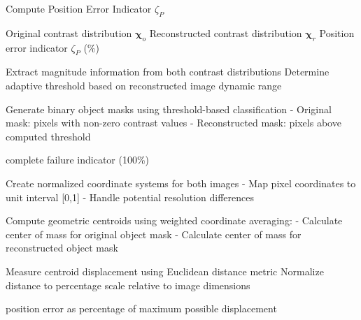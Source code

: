 \begin{algorithm}
\caption{Compute Position Error Indicator $\zeta_P$}
\label{alg:compute_zeta_p}
\begin{algorithmic}[1]
\REQUIRE Original contrast distribution $\boldsymbol{\chi}_o$
\REQUIRE Reconstructed contrast distribution $\boldsymbol{\chi}_r$
\ENSURE Position error indicator $\zeta_P$ (\%)

\STATE Extract magnitude information from both contrast distributions
\STATE Determine adaptive threshold based on reconstructed image dynamic range

\STATE Generate binary object masks using threshold-based classification
\STATE \quad - Original mask: pixels with non-zero contrast values
\STATE \quad - Reconstructed mask: pixels above computed threshold

    \RETURN complete failure indicator (100\%)
\ENDIF

\STATE Create normalized coordinate systems for both images
\STATE \quad - Map pixel coordinates to unit interval [0,1]
\STATE \quad - Handle potential resolution differences

\STATE Compute geometric centroids using weighted coordinate averaging:
\STATE \quad - Calculate center of mass for original object mask
\STATE \quad - Calculate center of mass for reconstructed object mask

\STATE Measure centroid displacement using Euclidean distance metric
\STATE Normalize distance to percentage scale relative to image dimensions

\RETURN position error as percentage of maximum possible displacement
\end{algorithmic}
\end{algorithm}
